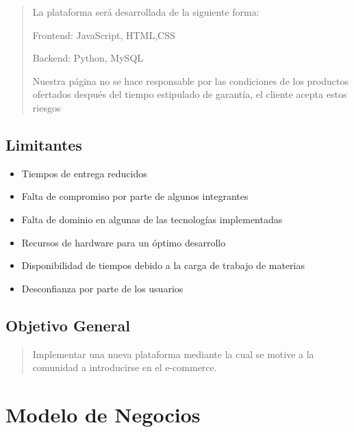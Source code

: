 \documentclass[14pt]{article}
\begin{document}
\begin{quote}
            \vspace{0.5cm}La plataforma será desarrollada de la siguiente forma:
    
            \vspace{0.5cm}Frontend: JavaScript, HTML,CSS 
    
            \vspace{0.5cm}Backend: Python, MySQL
    
            \vspace{0.5cm}Nuestra página no se hace responsable por las condiciones de los productos ofertados después del tiempo estipulado de garantía, el cliente acepta estos riesgos
        \end{quote}
        
        \subsection{Limitantes}
            \begin{itemize}
                \item Tiempos de entrega reducidos
                \item Falta de compromiso por parte de algunos integrantes
                \item Falta de dominio en algunas de las tecnologías implementadas
                \item Recursos de hardware para un óptimo desarrollo
                \item Disponibilidad de tiempos debido a la carga de trabajo de materias
                \item Desconfianza por parte de los usuarios 
            \end{itemize}
        
        \subsection{Objetivo General}
            \begin{quote}
                Implementar una nueva plataforma mediante la cual se motive a la comunidad a introducirse en el e-commerce.
            \end{quote}
        
    \section{Modelo de Negocios}
\end{document}
